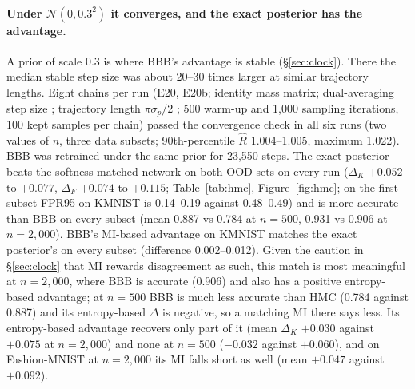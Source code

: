 \documentclass[10pt]{article}
\begin{document}
\paragraph{Under $\mathcal N(0,0.3^2)$ it converges, and the exact posterior has
the advantage.} A prior of scale 0.3 is where BBB's advantage is stable
(\S\ref{sec:clock}). There the median stable step size was about 20--30
times larger at similar trajectory lengths. Eight chains per run (E20, E20b;
identity mass matrix; dual-averaging step size \citep{hoffman2014nuts};
trajectory length $\pi\sigma_p/2$ \citep{izmailov2021what}; 500 warm-up and
1{,}000 sampling iterations, 100 kept samples per chain) passed the
convergence check in all six runs (two values of $n$, three data subsets;
90th-percentile $\hat R$ 1.004--1.005, maximum 1.022). BBB was retrained under
the same prior for 23{,}550 steps. The exact posterior beats the
softness-matched network on both OOD sets on every run ($\Delta_K$ $+0.052$
to $+0.077$, $\Delta_F$ $+0.074$ to $+0.115$; Table~\ref{tab:hmc},
Figure~\ref{fig:hmc}; on the first subset FPR95 on KMNIST is 0.14--0.19 against
0.48--0.49) and is more accurate than BBB on every subset (mean 0.887
vs 0.784 at $n=500$, 0.931 vs 0.906 at $n=2{,}000$). BBB's MI-based advantage
on KMNIST matches the exact posterior's on every subset (difference
0.002--0.012). Given the caution in \S\ref{sec:clock} that MI rewards
disagreement as such, this match is most meaningful at $n=2{,}000$, where BBB is
accurate (0.906) and also has a positive entropy-based advantage; at $n=500$
BBB is much less accurate than HMC (0.784 against 0.887) and its entropy-based
$\Delta$ is negative, so a matching MI there says less. Its entropy-based advantage recovers only part of it (mean
$\Delta_K$ $+0.030$ against $+0.075$ at $n=2{,}000$) and none at $n=500$
($-0.032$ against $+0.060$), and on Fashion-MNIST at $n=2{,}000$ its MI falls
short as well (mean $+0.047$ against $+0.092$).
\end{document}
